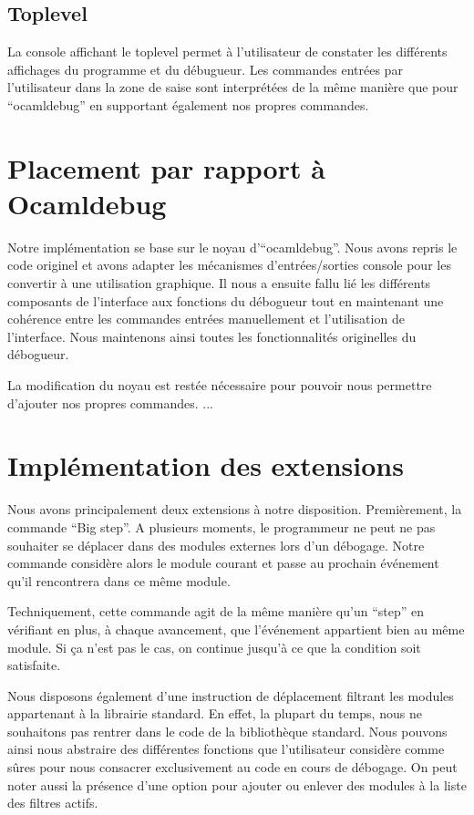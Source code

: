 \documentclass[11pt,a4paper]{report}
\begin{document}
\subsection{Toplevel}

La console affichant le toplevel permet à l'utilisateur de constater les différents affichages du programme
et du débugueur. Les commandes entrées par l'utilisateur dans la zone de saise sont interprétées de la même
manière que pour ``ocamldebug'' en supportant également nos propres commandes.

\section{Placement par rapport à Ocamldebug}

Notre implémentation se base sur le noyau d'``ocamldebug''. Nous avons repris le code originel et
avons adapter les mécanismes d'entrées/sorties console pour les convertir à une utilisation
graphique. Il nous a ensuite fallu lié les différents composants de l'interface aux fonctions du débogueur
tout en maintenant une cohérence entre les commandes entrées manuellement et l'utilisation de l'interface.
Nous maintenons ainsi toutes les fonctionnalités originelles du débogueur. 

La modification du noyau est restée nécessaire pour pouvoir nous permettre d'ajouter nos propres commandes.
...

\section{Implémentation des extensions}

Nous avons principalement deux extensions à notre disposition.
Premièrement, la commande ``Big step''. A plusieurs moments, le programmeur ne
peut ne pas souhaiter se déplacer dans des modules externes lors d'un débogage.
Notre commande considère alors le module courant et passe au prochain événement
qu'il rencontrera dans ce même module.

Techniquement, cette commande agit de la même manière qu'un ``step'' en vérifiant 
en plus, à chaque avancement, que l'événement appartient bien au même module. 
Si ça n'est pas le cas, on continue jusqu'à ce que la condition soit satisfaite.

Nous disposons également d'une instruction de déplacement filtrant les modules
appartenant à la librairie standard. En effet, la plupart du temps, nous ne souhaitons
pas rentrer dans le code de la bibliothèque standard. Nous pouvons ainsi nous abstraire
des différentes fonctions que l'utilisateur considère comme sûres pour nous consacrer
exclusivement au code en cours de débogage. On peut noter aussi la présence d'une option
pour ajouter ou enlever des modules à la liste des filtres actifs. 
\end{document}
